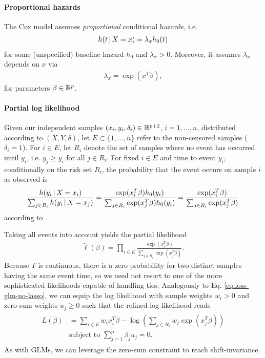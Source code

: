 \paragraph{Proportional hazards} The Cox model assumes \textit{proportional} conditional hazards, 
i.e. 
\begin{align}
    h(t \,|\, X = x) = \lambda_x h_0(t) 
\end{align}
for some (unspecified) baseline hazard $h_0$ and $\lambda_x > 0$. Moreover, it assumes $\lambda_x$ depends 
on $x$ via 
\begin{align}\label{eq:cox-proportional-factor}
    \lambda_x = \exp(x^T \beta),
\end{align}
for parameters $\beta \in \mathbb{R}^p$.

\paragraph{Partial log likelihood}
Given our independent samples $(x_i, y_i, \delta_i) \in \mathbb{R}^{p+2}$, $i = 1, \ldots, n$, distributed 
according to $(X, Y, \delta)$, let $E \subset \{ 1, \ldots, n \}$ refer to the non-censored samples 
($\delta_i = 1$). For $i \in E$, let $R_i$ denote the set of samples where no event has occurred 
until $y_i$, i.e. $y_j \geq y_i$ for all $j \in R_i$. For fixed $i \in E$ and time to event $y_i$,
conditionally on the risk set $R_i$, the probability that the event occurs on sample $i$ as 
observed is
\begin{align}
    \frac{h(y_i \,|\, X = x_i)}{\sum_{j \in R_i} h(y_i \,|\, X = x_j)} = 
    \frac{\exp(x_i^T \beta) h_0(y_i)}{\sum_{j \in R_i} \exp(x_j^T \beta) h_0(y_i)} = 
    \frac{\exp(x_i^T \beta)}{\sum_{j \in R_i} \exp(x_j^T \beta)}
\end{align}
according to \cite[Eq. (12)]{cox72}.

Taking all events into account yields the partial likelihood 
\begin{align}
    \tilde{\ell}(\beta) = \prod_{i \in E} \frac{\exp(x_i^T \beta)}{\sum_{j \in R_i} \exp(x_j^T 
    \beta)}.
\end{align}
Because $T$ is continuous, there is a zero probability for two distinct samples having the same 
event time, so we need not resort to one of the more sophisticated likelihoods capable of handling ties.
Analogously to Eq. \eqref{eq:loss-glm-no-lasso}, we can equip the log likelihood with sample 
weights $w_i > 0$ and zero-sum weights $u_j \geq 0$ such that the refined log likelihood reads 
\begin{align}\label{eq:cox-log-lh}
\begin{split}
    L(\beta) &= \sum_{i \in E} w_i x_i^T \beta - \log \left( \sum_{j \in R_i} w_j \exp(x_j^T
    \beta) \right) \\
    & \text{subject to } \sum_{j=1}^p \beta_j u_j = 0.
\end{split}
\end{align}
As with GLMs, we can leverage the zero-sum constraint to reach shift-invariance.

